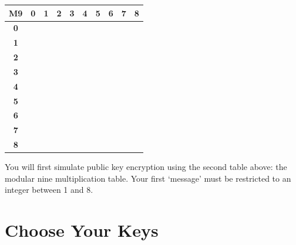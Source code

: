 \documentclass[11pt,a4paper]{article}
\begin{document}
\begin{enumerate}
    \begin{center}
        \renewcommand{\arraystretch}{1.5}
    \begin{tabular}{|c|c|c|c|c|c|c|c|c|c|}
    \hline
    \textbf{M9} & \textbf{0} & \textbf{1} & \textbf{2} & \textbf{3} & \textbf{4} & \textbf{5} & \textbf{6} & \textbf{7} & \textbf{8} \\
    \hline
    \textbf{0} &\hspace{.6cm} &\hspace{.6cm} &\hspace{.6cm} &\hspace{.6cm} &\hspace{.6cm} &\hspace{.6cm} &\hspace{.6cm} &\hspace{.6cm} &\hspace{.6cm} \\
    \hline
    \textbf{1} & & & & & & & & & \\
    \hline
    \textbf{2} & & & & & & & & & \\
    \hline
    \textbf{3} & & & & & & & & & \\
    \hline
    \textbf{4} & & & & & & & & & \\
    \hline
    \textbf{5} & & & & & & & & & \\
    \hline
    \textbf{6} & & & & & & & & & \\
    \hline
    \textbf{7} & & & & & & & & & \\
    \hline
    \textbf{8} & & & & & & & & & \\
    \hline
    \end{tabular}
    \end{center}
\end{enumerate}

\newpage

You will first simulate public key encryption using the second table above: the modular nine multiplication table. Your first `message' must be restricted to an integer between 1 and 8.

\section*{Choose Your Keys}
\end{document}

